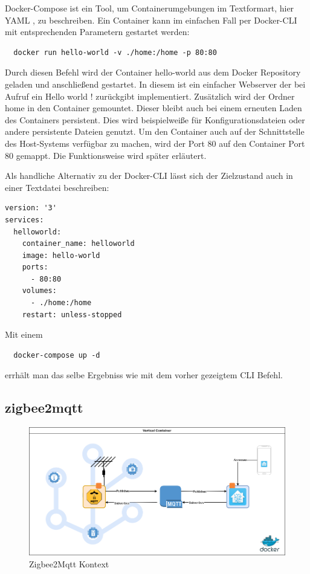 Docker-Compose ist ein Tool, um Containerumgebungen im Textformart, hier \grqq YAML \grqq{}, zu beschreiben.
Ein Container kann im einfachen Fall per Docker-CLI mit entsprechenden Parametern gestartet werden:
\begin{lstlisting}
  docker run hello-world -v ./home:/home -p 80:80
\end{lstlisting}

Durch diesen Befehl wird der Container \grqq hello-world \grqq aus dem Docker Repository geladen und anschließend gestartet. In diesem ist ein einfacher Webserver der bei
Aufruf ein \grqq Hello world ! \grqq{} zurückgibt implementiert. Zusätzlich wird der Ordner \grqq home \grqq{} in den Container gemountet. Dieser bleibt auch bei einem
erneuten Laden des Containers persistent. Dies wird beispielweiße für Konfigurationsdateien oder andere persistente Dateien genutzt. Um den Container auch auf der Schnittstelle
des Host-Systems verfügbar zu machen, wird der Port 80 auf den Container Port 80 gemappt. Die Funktionsweise wird später erläutert.

Als handliche Alternativ zu der Docker-CLI lässt sich der Zielzustand auch in einer Textdatei beschreiben:

\begin{lstlisting}
version: '3'
services:
  helloworld:
    container_name: helloworld
    image: hello-world
    ports:
      - 80:80
    volumes:
      - ./home:/home
    restart: unless-stopped
\end{lstlisting}

Mit einem 
\begin{lstlisting}
  docker-compose up -d
\end{lstlisting}

errhält man das selbe Ergebniss wie mit dem vorher gezeigtem CLI Befehl.

\subsection{zigbee2mqtt}

\begin{figure}[H]
  \centering
  \includegraphics[width=1\textwidth]{media/z2m-arch.png}
  \caption{Zigbee2Mqtt Kontext}
\end{figure}

